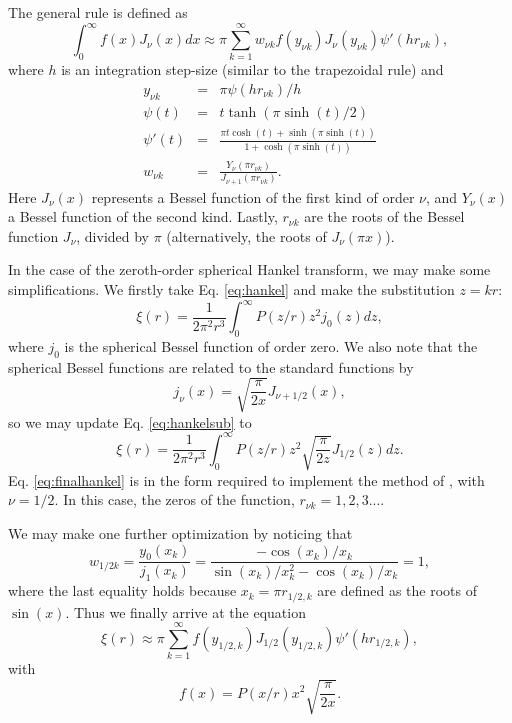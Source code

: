 \documentclass[5p,aas_macros]{elsarticle}
\begin{document}
The general rule is defined as
\begin{equation}
	\label{eq:hankeltrans}
	\int_0^\infty f(x)J_\nu(x) dx \approx \pi \sum_{k=1}^\infty w_{\nu k} f(y_{\nu k})J_\nu(y_{\nu k})\psi'(hr_{\nu k}),
\end{equation}
where $h$ is an integration step-size (similar to the trapezoidal rule) and
\begin{eqnarray}
	y_{\nu k} &=& \pi \psi(hr_{\nu k})/h \\
	\psi(t) &=& t\tanh(\pi \sinh(t)/2) \\
	\psi'(t) &=& \frac{\pi t \cosh(t) + \sinh(\pi \sinh(t))}{ 1 + \cosh(\pi \sinh(t))} \\
	w_{\nu k} &=& \frac{Y_\nu(\pi r_{\nu k})}{J_{\nu+1}(\pi r_{\nu k})}.
\end{eqnarray}
Here $J_\nu(x)$ represents a Bessel function of the first kind of order $\nu$, and $Y_\nu(x)$ a Bessel function of the second kind. Lastly, $r_{\nu k}$ are the roots of the Bessel function $J_\nu$, divided by $\pi$ (alternatively, the roots of $J_\nu(\pi x)$).

In the case of the zeroth-order spherical Hankel transform, we may make some simplifications. We firstly take Eq. \ref{eq:hankel} and make the substitution $z=kr$:
\begin{equation}
	\label{eq:hankelsub}
	\xi(r) = \frac{1}{2\pi^2r^3}\int_0^\infty P(z/r)z^2j_0(z)dz,
\end{equation} 
where $j_0$ is the spherical Bessel function of order zero. We also note that the spherical Bessel functions are related to the standard functions by
\begin{equation}
	\label{eq:sphbessel}
	j_\nu(x) = \sqrt{\frac{\pi}{2x}}J_{\nu+1/2}(x),
\end{equation}
so we may update Eq. \ref{eq:hankelsub} to
\begin{equation}
	\label{eq:finalhankel}
	\xi(r) = \frac{1}{2\pi^2r^3}\int_0^\infty P(z/r) z^2\sqrt{\frac{\pi}{2z}}J_{1/2}(z)dz.
\end{equation}
Eq. \ref{eq:finalhankel} is in the form required to implement the method of \cite{Ogata2005}, with $\nu=1/2$. In this case, the zeros of the function, $r_{\nu k} = 1,2,3...$. 

We may make one further optimization by noticing that 
\begin{equation}
	\label{eq:weq1}
	w_{1/2 k} = \frac{y_0(x_k)}{j_1(x_k)} = \frac{-\cos(x_k)/x_k}{\sin(x_k)/x_k^2 - \cos(x_k)/x_k} = 1,
\end{equation}
where the last equality holds because $x_k = \pi r_{1/2,k}$ are defined as the roots of $\sin(x)$.
Thus we finally arrive at the equation
\begin{equation}
	\label{eq:hankel_final_identity}
	\xi(r) \approx \pi \sum_{k=1}^\infty f(y_{1/2, k})J_{1/2}(y_{1/2, k})\psi'(hr_{1/2, k}),
\end{equation}
with
\begin{equation}
	\label{eq:f}
	f(x) = P(x/r)x^2\sqrt{\frac{\pi}{2x}}.
\end{equation}
\end{document}
